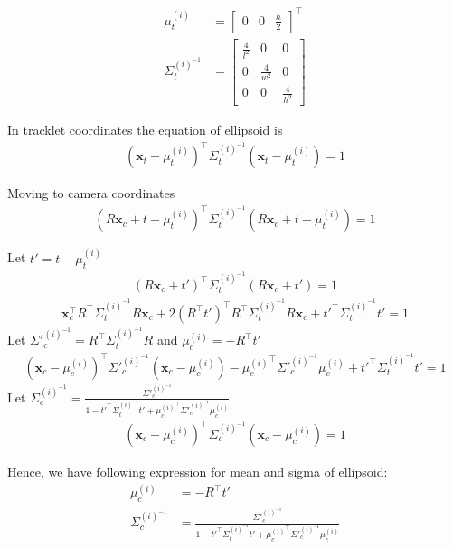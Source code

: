\documentclass[10pt,twocolumn,letterpaper]{article}
\newcommand{\Sigmait}{\Sigma^{(i)^{-1}}_t}
\newcommand{\muit}{\mu^(i)_t}
\newcommand{\Sigmaic}{\Sigma'^{(i)^{-1}}_c}
\newcommand{\muic}{{\mu^(i)_c}}
\newcommand{\Sigmaicf}{\Sigma^{(i)^{-1}}_c}
\newcommand{\xt}{\mathbf{x}_t}
\newcommand{\xc}{\mathbf{x}_c}
\newcommand{\Rctot}{R}
\newcommand{\tctot}{t}
\newcommand{\tcmut}{t'}
\begin{document}
\begin{align}
  \muit &= \begin{bmatrix}
  0& 0& \frac{h}{2}
  \end{bmatrix}^\top\\
  \Sigmait &= \begin{bmatrix}
    \frac{4}{l^2} & 0 & 0 \\
    0 & \frac{4}{w^2} & 0 \\
    0 & 0 & \frac{4}{h^2}
  \end{bmatrix}
\end{align}

In tracklet coordinates the equation of ellipsoid is 
\begin{align}
  (\xt - \muit)^\top \Sigmait (\xt - \muit) = 1
\end{align}


Moving to camera coordinates
\begin{align}
  (\Rctot \xc + \tctot - \muit)^\top \Sigmait (\Rctot \xc + \tctot - \muit) = 1
\end{align}

Let $\tcmut = \tctot - \muit$
\begin{align}
  (\Rctot \xc + \tcmut)^\top \Sigmait (\Rctot \xc + \tcmut) = 1
\end{align}
\begin{align}
  \xc^\top \Rctot^\top \Sigmait \Rctot \xc + 2 (\Rctot^\top \tcmut)^\top  \Rctot^\top\Sigmait \Rctot \xc
  + \tcmut^\top \Sigmait \tcmut = 1
\end{align}
Let $\Sigmaic = \Rctot^\top \Sigmait \Rctot$ and $\muic = - \Rctot^\top
\tcmut$
\begin{align}
  (\xc - \muic)^\top\Sigmaic(\xc - \muic) - \muic^\top\Sigmaic\muic +
  \tcmut^\top \Sigmait \tcmut = 1
\end{align}
Let $\Sigmaicf = \frac{\Sigmaic}{1 - \tcmut^\top \Sigmait \tcmut +
\muic^\top\Sigmaic\muic}$
\begin{align}
(\xc - \muic)^\top\Sigmaicf(\xc - \muic) = 1
\end{align}

Hence, we have following expression for mean and sigma of ellipsoid:
\begin{align}
  \label{eq:ellipsoidMeanSigma}
  \muic &= - \Rctot^\top \tcmut \\
  \Sigmaicf &= \frac{\Sigmaic}
{1 - \tcmut^\top \Sigmait \tcmut + \muic^\top\Sigmaic\muic}
\end{align}
\end{document}
